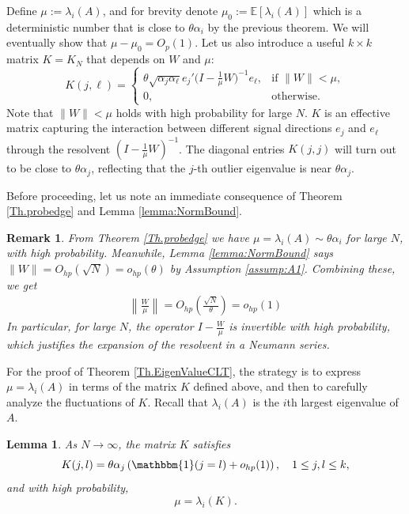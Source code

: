 \documentclass[11pt, reqno]{amsart}
\DeclareMathOperator{\one}{\mathbbm{1}} %
\numberwithin{equation}{section}
\newtheorem{lemma}{Lemma}[section]
\newtheorem{remark}{Remark}[section]
\newcommand{\E}{\mbox{${\mathbb E}$}}
\begin{document}
Define $\mu := \lambda_i(A)$, and for brevity denote $\mu_0 := \E[\lambda_i(A)]$ which is a deterministic number that is close to $\theta \alpha_i$ by the previous theorem. We will eventually show that $\mu - \mu_0 = O_p(1)$. Let us also introduce a useful $k\times k$ matrix $K = K_N$ that depends on $W$ and $\mu$:
\begin{equation}\label{eq:VMatrix}
K(j,\ell) =
\begin{cases}
\displaystyle \theta\sqrt{\alpha_j \alpha_\ell} e_j' \Big(I - \frac{1}{\mu}W\Big)^{-1} e_\ell, &\text{if $\|W\| < \mu$},\\
0, &\text{otherwise}.
\end{cases}
\end{equation}
Note that $\|W\|<\mu$ holds with high probability for large $N$. $K$ is an effective matrix capturing the interaction between different signal directions $e_j$ and $e_\ell$ through the resolvent $(I - \frac{1}{\mu}W)^{-1}$. The diagonal entries $K(j,j)$ will turn out to be close to $\theta \alpha_j$, reflecting that the $j$-th outlier eigenvalue is near $\theta \alpha_j$.

Before proceeding, let us note an immediate consequence of Theorem \ref{Th.probedge} and Lemma \ref{lemma:NormBound}.

\begin{remark}\label{Bound.W/mu}
 From Theorem \ref{Th.probedge} we have $\mu = \lambda_i(A) \sim \theta \alpha_i$ for large $N$, with high probability. Meanwhile, Lemma \ref{lemma:NormBound} says $\|W\| = O_{hp}(\sqrt{N}) = o_{hp}(\theta)$ by Assumption \ref{assump:A1}. Combining these, we get
\begin{align*}
\left\|\frac{W}{\mu}\right\|=O_{hp}\left(\frac{\sqrt{N}}{\theta}\right) = o_{hp}(1)
\end{align*}
In particular, for large $N$, the operator $I - \frac{W}{\mu}$ is invertible with high probability, which justifies the expansion of the resolvent in a Neumann series.
\end{remark}

For the proof of Theorem \ref{Th.EigenValueCLT}, the strategy is to express $\mu = \lambda_i(A)$ in terms of the matrix $K$ defined above, and then to carefully analyze the fluctuations of $K$. Recall that $\lambda_i(A)$ is the $i$th largest eigenvalue of $A$. 

\begin{lemma}\label{EVa.combined}
As \( N \to \infty \), the matrix \( K \) satisfies
\[
K(j, l) = \theta \alpha_j \left( \one(j = l) + o_{hp}(1) \right), \quad 1 \le j, l \le k,
\]
and with high probability,
\[
\mu = \lambda_i(K).
\]
\end{lemma}
\end{document}
